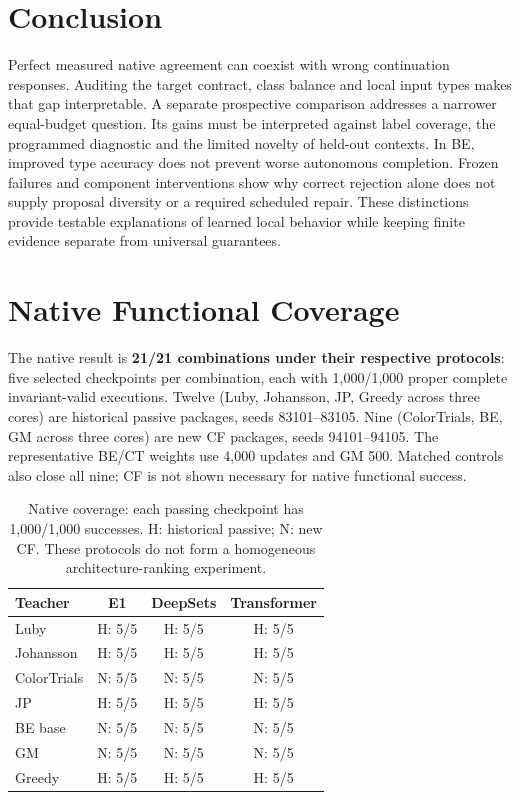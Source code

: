 \documentclass[10pt]{article}
\begin{document}
\section{Conclusion}
Perfect measured native agreement can coexist with wrong continuation
responses. Auditing the target contract, class balance and local input types
makes that gap interpretable. A separate prospective comparison addresses a
narrower equal-budget question. Its gains must be interpreted against label
coverage, the programmed diagnostic and the limited novelty of held-out
contexts. In BE, improved type accuracy does not prevent worse autonomous
completion. Frozen failures and component interventions
show why correct rejection alone does not supply proposal diversity or a
required scheduled repair. These distinctions provide testable explanations
of learned local behavior while keeping finite evidence separate from
universal guarantees.

\appendix

\section{Native Functional Coverage}\label{app:coverage}
The native result is \textbf{21/21 combinations under their respective
protocols}: five selected checkpoints per combination, each with 1,000/1,000
proper complete invariant-valid executions. Twelve (Luby, Johansson, JP,
Greedy across three cores) are historical passive packages, seeds
83101--83105. Nine (ColorTrials, BE, GM across three cores) are new CF
packages, seeds 94101--94105. The representative BE/CT weights use 4,000
updates and GM 500. Matched controls also close all nine; CF is not shown
necessary for native functional success.

\begin{table}[htbp]\centering\small
\begin{tabular}{lccc}
\toprule Teacher & E1 & DeepSets & Transformer \\
\midrule
Luby & H: 5/5 & H: 5/5 & H: 5/5 \\
Johansson & H: 5/5 & H: 5/5 & H: 5/5 \\
ColorTrials & N: 5/5 & N: 5/5 & N: 5/5 \\
JP & H: 5/5 & H: 5/5 & H: 5/5 \\
BE base & N: 5/5 & N: 5/5 & N: 5/5 \\
GM & N: 5/5 & N: 5/5 & N: 5/5 \\
Greedy & H: 5/5 & H: 5/5 & H: 5/5 \\
\bottomrule
\end{tabular}
\caption{Native coverage: each passing checkpoint has 1,000/1,000 successes.
H: historical passive; N: new CF. These protocols do not form a homogeneous
architecture-ranking experiment.}
\label{tab:coverage}
\end{table}
\end{document}
